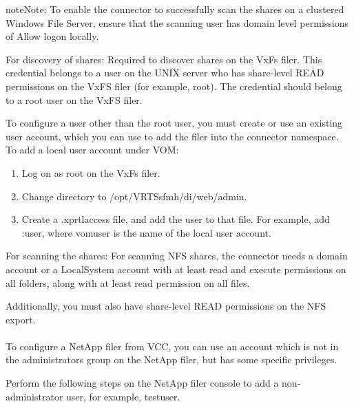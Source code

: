 \documentclass[letterpaper,10pt,english]{sphinxmanual}
\begin{document}
\begin{sphinxadmonition}{note}{Note:}
To enable the connector to successfully scan the shares on a clustered Windows File Server, ensure that the scanning user has domain level permissions of Allow logon locally.
\end{sphinxadmonition}


For discovery of shares: Required to discover shares on the VxFs filer. This credential belongs to a user on the UNIX server who has share-level READ permissions on the VxFS filer (for example, root). The credential should belong to a root user on the VxFS filer.

To configure a user other than the root user, you must create or use an existing user account, which you can use to add the filer into the connector namespace. To add a local user account under VOM:
\begin{enumerate}
\item {} 
Log on as root on the VxFs filer.

\item {} 
Change directory to /opt/VRTSsfmh/di/web/admin.

\item {} 
Create a .xprtlaccess file, and add the user to that file. For example, add :user, where vomuser is the name of the local user account.

\end{enumerate}

For scanning the shares: For scanning NFS shares, the connector needs a domain account or a LocalSystem account with at least read and execute permissions on all folders, along with at least read permission on all files.

Additionally, you must also have share-level READ permissions on the NFS export.


\paragraph{}
\label{\detokenize{mcdmp_app_ug:preparing-a-non-administrator-domain-user-on-the-netapp-filer}}
To configure a NetApp filer from VCC, you can use an account which is not in the administrators group on the NetApp filer, but has some specific privileges.

Perform the following steps on the NetApp filer console to add a non-administrator user, for example, testuser.
\end{document}
